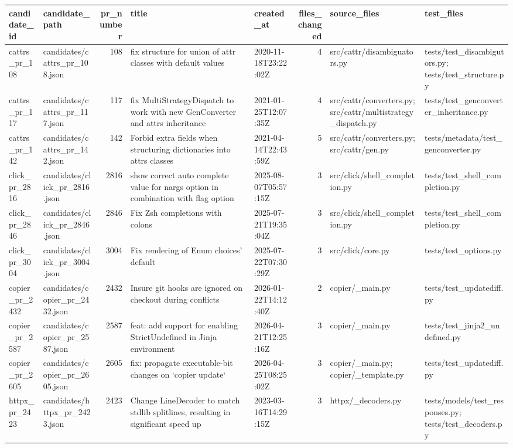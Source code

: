 \begin{tabular}{llrllrll}
\toprule
candidate\_id & candidate\_path & pr\_number & title & created\_at & files\_changed & source\_files & test\_files \\
\midrule
cattrs\_pr\_108 & candidates/cattrs\_pr\_108.json & 108 & fix structure for union of attr classes with default values & 2020-11-18T23:22:02Z & 4 & src/cattr/disambiguators.py & tests/test\_disambigutors.py; tests/test\_structure.py \\
cattrs\_pr\_117 & candidates/cattrs\_pr\_117.json & 117 & fix MultiStrategyDispatch to work with new GenConverter and attrs inheritance & 2021-01-25T12:07:35Z & 4 & src/cattr/converters.py; src/cattr/multistrategy\_dispatch.py & tests/test\_genconverter\_inheritance.py \\
cattrs\_pr\_142 & candidates/cattrs\_pr\_142.json & 142 & Forbid extra fields when structuring dictionaries into attrs classes & 2021-04-14T22:43:59Z & 5 & src/cattr/converters.py; src/cattr/gen.py & tests/metadata/test\_genconverter.py \\
click\_pr\_2816 & candidates/click\_pr\_2816.json & 2816 & show correct auto complete value for nargs option in combination with flag option & 2025-08-07T05:57:15Z & 3 & src/click/shell\_completion.py & tests/test\_shell\_completion.py \\
click\_pr\_2846 & candidates/click\_pr\_2846.json & 2846 & Fix Zsh completions with colons & 2025-07-21T19:35:04Z & 3 & src/click/shell\_completion.py & tests/test\_shell\_completion.py \\
click\_pr\_3004 & candidates/click\_pr\_3004.json & 3004 & Fix rendering of Enum choices' default & 2025-07-22T07:30:29Z & 3 & src/click/core.py & tests/test\_options.py \\
copier\_pr\_2432 & candidates/copier\_pr\_2432.json & 2432 & Insure git hooks are ignored on checkout during conflicts & 2026-01-22T14:12:40Z & 2 & copier/\_main.py & tests/test\_updatediff.py \\
copier\_pr\_2587 & candidates/copier\_pr\_2587.json & 2587 & feat: add support for enabling StrictUndefined in Jinja environment & 2026-04-21T12:25:16Z & 3 & copier/\_main.py & tests/test\_jinja2\_undefined.py \\
copier\_pr\_2605 & candidates/copier\_pr\_2605.json & 2605 & fix: propagate executable-bit changes on `copier update` & 2026-04-25T08:25:02Z & 3 & copier/\_main.py; copier/\_template.py & tests/test\_updatediff.py \\
httpx\_pr\_2423 & candidates/httpx\_pr\_2423.json & 2423 & Change LineDecoder to match stdlib splitlines, resulting in significant speed up & 2023-03-16T14:29:15Z & 3 & httpx/\_decoders.py & tests/models/test\_responses.py; tests/test\_decoders.py \\

\end{tabular}
